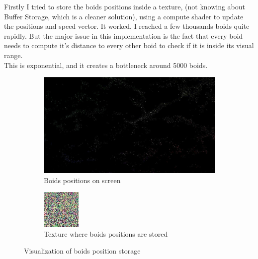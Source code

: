 \documentclass{article}
\begin{document}
Firstly I tried to store the boids positions inside a texture, (not knowing about Buffer Storage, which is a cleaner solution), using a compute shader to update the positions and speed vector. It worked, I reached a few thousands boids quite rapidly. But the major issue in this implementation is the fact that every boid needs to compute it's distance to every other boid to check if it is inside its visual range.\\
This is exponential, and it creates a bottleneck around 5000 boids.\\
\begin{figure}[H]
    \centering
    \begin{subfigure}[H]{\textwidth}
        \centering
        \includegraphics[width=.9\linewidth]{boids_positions.jpg}
        \caption{Boids positions on screen}
    \end{subfigure}
    \begin{subfigure}[H]{\textwidth}
        \centering
        \includegraphics[width=.4\linewidth]{boids_positions_texture.jpg}
        \caption{Texture where boids positions are stored}
    \end{subfigure}
    \caption{Visualization of boids position storage}
\end{figure}
\end{document}

